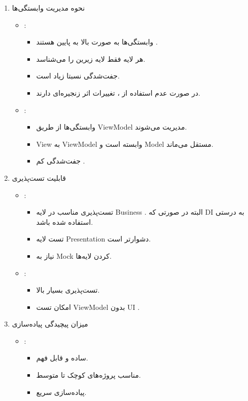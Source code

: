 \begin{enumerate}
    \item {نحوه مدیریت وابستگی‌ها}
    \begin{itemize}
    \item {}:
    \begin{itemize}
    \item وابستگی‌ها به صورت بالا به پایین هستند .
    \item هر لایه فقط لایه زیرین را می‌شناسد.
    \item جفت‌شدگی نسبتا زیاد است.
    \item در صورت عدم استفاده از ، تغییرات اثر زنجیره‌ای دارند.
    \end{itemize}
    
    \item {:}
    \begin{itemize}
    \item وابستگی‌ها از طریق ViewModel مدیریت می‌شوند.
    \item View به ViewModel وابسته است و Model مستقل می‌ماند.
    \item جفت‌شدگی کم .
    \end{itemize}
    \end{itemize}
    
    \item {قابلیت تست‌پذیری}
    \begin{itemize}
    \item {}:
    \begin{itemize}
    \item تست‌پذیری مناسب در لایه Business . البته در صورتی که DI به درستی استفاده شده باشد.
    \item تست لایه Presentation دشوارتر است.
    \item نیاز به Mock کردن لایه‌ها.
    \end{itemize}
    
    \item {:}
    \begin{itemize}
    \item تست‌پذیری بسیار بالا.
    \item امکان تست ViewModel بدون UI .
    \end{itemize}
    \end{itemize}
    
    \item {میزان پیچیدگی پیاده‌سازی}
    \begin{itemize}
    \item {}:
    \begin{itemize}
    \item ساده و قابل فهم.
    \item مناسب پروژه‌های کوچک تا متوسط.
    \item پیاده‌سازی سریع.
    \end{itemize}
    

\end{itemize}
\end{enumerate}
